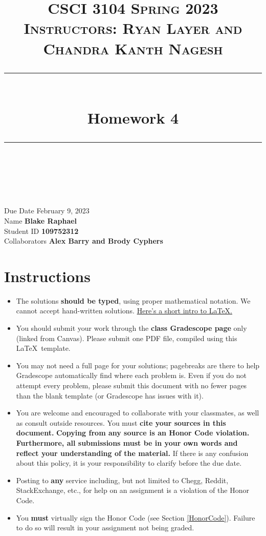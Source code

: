 \documentclass[11pt]{article}
\title{
\normalfont \normalsize 
\textsc{CSCI 3104 Spring 2023 \\ 
Instructors: Ryan Layer and Chandra Kanth Nagesh} \\
[10pt] 
\rule{\linewidth}{0.5pt} \\[6pt] 
\huge Homework 4 \\
\rule{\linewidth}{2pt}  \\[10pt]
}
\date{}
\theoremstyle{definition}
\theoremstyle{definition}
\theoremstyle{definition}
\begin{document}

\maketitle


\noindent
Due Date \dotfill February 9, 2023 \\
Name \dotfill \textbf{Blake Raphael} \\
Student ID \dotfill \textbf{109752312} \\
Collaborators \dotfill \textbf{Alex Barry and Brody Cyphers}

\tableofcontents

\section{Instructions}
 \begin{itemize}
	\item The solutions \textbf{should be typed}, using proper mathematical notation. We cannot accept hand-written solutions. \href{http://ece.uprm.edu/~caceros/latex/introduction.pdf}{Here's a short intro to \LaTeX.}
	\item You should submit your work through the \textbf{class Gradescope page} only (linked from Canvas). Please submit one PDF file, compiled using this \LaTeX \ template.
	\item You may not need a full page for your solutions; pagebreaks are there to help Gradescope automatically find where each problem is. Even if you do not attempt every problem, please submit this document with no fewer pages than the blank template (or Gradescope has issues with it).

	\item You are welcome and encouraged to collaborate with your classmates, as well as consult outside resources. You must \textbf{cite your sources in this document.} \textbf{Copying from any source is an Honor Code violation. Furthermore, all submissions must be in your own words and reflect your understanding of the material.} If there is any confusion about this policy, it is your responsibility to clarify before the due date. 

	\item Posting to \textbf{any} service including, but not limited to Chegg, Reddit, StackExchange, etc., for help on an assignment is a violation of the Honor Code.

	\item You \textbf{must} virtually sign the Honor Code (see Section \ref{HonorCode}). Failure to do so will result in your assignment not being graded.
\end{itemize}
\end{document}
